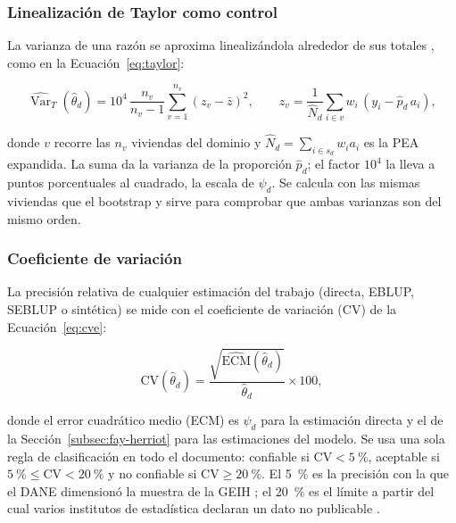 \subsubsection{Linealización de Taylor como control}

La varianza de una razón se aproxima linealizándola alrededor de sus totales \cite[p.~22]{morales2021smallarea}, como en la Ecuación~\ref{eq:taylor}:

\begin{equation}
    \widehat{\operatorname{Var}}_T(\hat{\theta}_d) = 10^4\,\frac{n_v}{n_v - 1} \sum_{v=1}^{n_v} \left(z_v - \bar{z}\right)^2, \qquad z_v = \frac{1}{\hat{N}_d}\sum_{i \in v} w_i\,(y_i - \hat{p}_d\, a_i),
    \label{eq:taylor}
\end{equation}

donde $v$ recorre las $n_v$ viviendas del dominio y $\hat{N}_d = \sum_{i\in s_d} w_i a_i$ es la PEA expandida. La suma da la varianza de la proporción $\hat{p}_d$; el factor $10^4$ la lleva a puntos porcentuales al cuadrado, la escala de $\psi_d$. Se calcula con las mismas viviendas que el bootstrap y sirve para comprobar que ambas varianzas son del mismo orden.

\subsubsection{Coeficiente de variación}

La precisión relativa de cualquier estimación del trabajo (directa, EBLUP, SEBLUP o sintética) se mide con el coeficiente de variación (CV) de la Ecuación~\ref{eq:cve}:

\begin{equation}
    \text{CV}(\hat{\theta}_d) = \frac{\sqrt{\widehat{\text{ECM}}(\hat{\theta}_d)}}{\hat{\theta}_d} \times 100,
    \label{eq:cve}
\end{equation}

donde el error cuadrático medio (ECM) es $\psi_d$ para la estimación directa y el de la Sección~\ref{subsec:fay-herriot} para las estimaciones del modelo. Se usa una sola regla de clasificación en todo el documento: confiable si $\text{CV} < 5~\%$, aceptable si $5~\% \leq \text{CV} < 20~\%$ y no confiable si $\text{CV} \geq 20~\%$. El 5~\% es la precisión con la que el DANE dimensionó la muestra de la GEIH \cite[p.~12]{DANE_GEIH_Metodologia2016}; el 20~\% es el límite a partir del cual varios institutos de estadística declaran un dato no publicable \cite[pp.~14--15]{Molina2019}.

